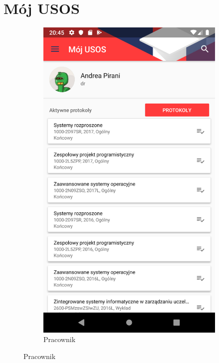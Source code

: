 \documentclass{pracamgr}
\begin{document}
\clearpage

\section{Mój USOS}

\begin{figure}[p]
	\centering
	\begin{subfigure}[t]{0.3\textwidth}
		\includegraphics[width=\textwidth]{img/myusos_employee.png}
		\caption{Pracownik}

\end{subfigure}
\end{figure}
\end{document}
